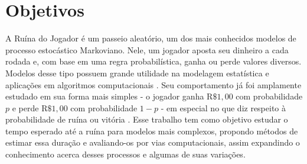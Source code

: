 \documentclass[a4paper,10pt,twocolumn]{article}
\begin{document}
\pagestyle{fancy}
\fancyhead{}
\renewcommand{\headrulewidth}{0pt}


\section{Objetivos}

A Ruína do Jogador é um passeio aleatório, um dos mais conhecidos modelos de
processo estocástico Markoviano. Nele, um jogador aposta seu dinheiro a cada
rodada e, com base em uma regra probabilística, ganha ou perde valores diversos.
Modelos desse tipo possuem grande utilidade na modelagem estatística e
aplicações em algoritmos computacionais \cite{ross_markov_2019}. Seu
comportamento já foi amplamente estudado em sua forma mais simples - o jogador
ganha $\mathrm{R}\$1,00$ com probabilidade $p$ e perde $\mathrm{R}\$1,00$ com
probabilidade $1-p$ - em especial no que diz respeito à probabilidade de ruína
ou vitória \cite{ross_introduction_2019}. Esse trabalho tem como objetivo
estudar o tempo esperado até a ruína para modelos mais complexos, propondo
métodos de estimar essa duração e avaliando-os por vias computacionais, assim
expandindo o conhecimento acerca desses processos e algumas de suas variações.
\end{document}
